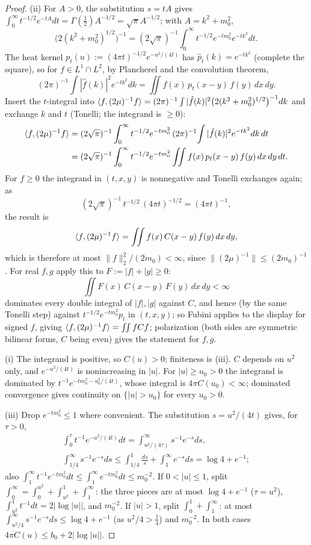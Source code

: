 \begin{proof}
(ii) For $A>0$, the substitution $s=tA$ gives $\int_0^\infty t^{-1/2}e^{-tA}dt=\Gamma(\frac12)
A^{-1/2}=\sqrt\pi A^{-1/2}$; with $A=k^2+m_0^2$,
\[
 \bigl(2(k^2+m_0^2)^{1/2}\bigr)^{-1}=(2\sqrt\pi)^{-1}\int_0^\infty t^{-1/2}e^{-tm_0^2}e^{-tk^2}dt .
\]
The heat kernel $p_t(u):=(4\pi t)^{-1/2}e^{-u^2/(4t)}$ has $\hat p_t(k)=e^{-tk^2}$ (complete the
square), so for $f\in L^1\cap L^2$, by Plancherel and the convolution theorem,
\[
 (2\pi)^{-1}\int|\hat f(k)|^2e^{-tk^2}dk=\iint f(x)\,p_t(x-y)\,f(y)\,dx\,dy .
\]
Insert the $t$-integral into
$\langle f,(2\mu)^{-1}f\rangle=(2\pi)^{-1}\int|\hat f(k)|^2\bigl(2(k^2+m_0^2)^{1/2}\bigr)^{-1}dk$ and
exchange $k$ and $t$ (Tonelli; the integrand is $\ge0$):
\begin{align*}
 \langle f,(2\mu)^{-1}f\rangle
 &=(2\sqrt\pi)^{-1}\int_0^\infty t^{-1/2}e^{-tm_0^2}\,
   (2\pi)^{-1}\!\int|\hat f(k)|^2e^{-tk^2}dk\,dt\\
 &=(2\sqrt\pi)^{-1}\int_0^\infty t^{-1/2}e^{-tm_0^2}\iint f(x)\,p_t(x-y)\,f(y)\,dx\,dy\,dt .
\end{align*}
For $f\ge0$ the integrand in $(t,x,y)$ is nonnegative and Tonelli exchanges again; as
\[
 (2\sqrt\pi)^{-1}\,t^{-1/2}\,(4\pi t)^{-1/2}=(4\pi t)^{-1},
\]
the result is
\[
 \langle f,(2\mu)^{-1}f\rangle=\iint f(x)\,C(x-y)\,f(y)\,dx\,dy ,
\]
which is therefore at most $\|f\|_2^2/(2m_0)<\infty$, since $\|(2\mu)^{-1}\|\le(2m_0)^{-1}$.  For real $f,g$ apply this to
$F:=|f|+|g|\ge0$:
\[
 \iint F(x)\,C(x-y)\,F(y)\,dx\,dy<\infty
\]
dominates every double integral of $|f|,|g|$ against $C$, and hence (by the same Tonelli
step) against $t^{-1/2}e^{-tm_0^2}p_t$ in $(t,x,y)$; so Fubini applies to the display for
signed $f$, giving $\langle f,(2\mu)^{-1}f\rangle=\iint fCf$; polarization (both sides are
symmetric bilinear forms, $C$ being even) gives the statement for $f,g$.

(i) The integrand is positive, so $C(u)>0$; finiteness is (iii).  $C$ depends on $u^2$
only, and $e^{-u^2/(4t)}$ is nonincreasing in $|u|$.  For $|u|\ge u_0>0$ the integrand is
dominated by $t^{-1}e^{-tm_0^2-u_0^2/(4t)}$, whose integral is $4\pi C(u_0)<\infty$; dominated
convergence gives continuity on $\{|u|>u_0\}$ for every $u_0>0$.

(iii) Drop $e^{-tm_0^2}\le1$ where convenient.  The substitution $s=u^2/(4t)$ gives,
for $\tau>0$,
\[
\begin{gathered}
 \int_0^{\tau}t^{-1}e^{-u^2/(4t)}dt=\int_{u^2/(4\tau)}^\infty s^{-1}e^{-s}ds,\\
 \int_{1/4}^\infty s^{-1}e^{-s}ds\le\int_{1/4}^1\frac{ds}s+\int_1^\infty e^{-s}ds=\log4+e^{-1};
\end{gathered}
\]
also $\int_1^\infty t^{-1}e^{-tm_0^2}dt\le\int_1^\infty e^{-tm_0^2}dt\le m_0^{-2}$.  If
$0<|u|\le1$, split $\int_0^\infty=\int_0^{u^2}+\int_{u^2}^1+\int_1^\infty$: the three pieces
are at most $\log4+e^{-1}$ ($\tau=u^2$), $\int_{u^2}^1t^{-1}dt=2|\log|u||$, and $m_0^{-2}$.  If
$|u|>1$, split $\int_0^1+\int_1^\infty$: at most $\int_{u^2/4}^\infty s^{-1}e^{-s}ds\le
\log4+e^{-1}$ (as $u^2/4>\frac14$) and $m_0^{-2}$.  In both cases $4\pi C(u)\le
b_0+2|\log|u||$.


\end{proof}
